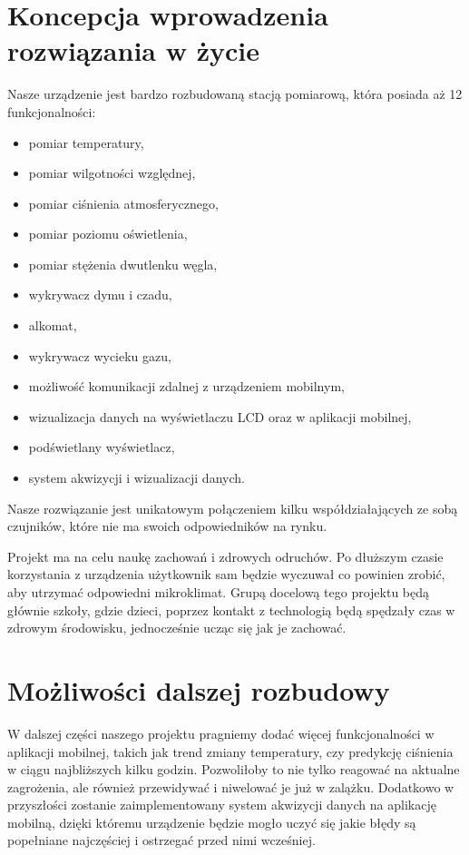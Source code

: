\documentclass[12pt,a4paper]{article}
\begin{document}
\section{Koncepcja wprowadzenia rozwiązania w życie}
Nasze urządzenie jest bardzo rozbudowaną stacją pomiarową, która posiada aż 12 funkcjonalności:
\begin{itemize}
\item pomiar temperatury,
\item pomiar wilgotności względnej,
\item pomiar ciśnienia atmosferycznego,
\item pomiar poziomu oświetlenia,
\item pomiar stężenia dwutlenku węgla,
\item wykrywacz dymu i czadu,
\item alkomat,
\item wykrywacz wycieku gazu,
\item możliwość komunikacji zdalnej z urządzeniem mobilnym,
\item wizualizacja danych na wyświetlaczu LCD oraz w aplikacji mobilnej,
\item podświetlany wyświetlacz,
\item system akwizycji i wizualizacji danych.
\end{itemize}

Nasze rozwiązanie jest unikatowym połączeniem kilku współdziałających ze sobą czujników, które nie ma swoich odpowiedników na rynku. 

Projekt ma na celu naukę zachowań i zdrowych odruchów. Po dłuższym czasie korzystania z urządzenia użytkownik sam będzie wyczuwał co powinien zrobić, aby utrzymać odpowiedni mikroklimat. Grupą docelową tego projektu będą głównie szkoły, gdzie dzieci, poprzez kontakt z technologią będą spędzały czas w zdrowym środowisku, jednocześnie ucząc się jak je zachować.


\section{Możliwości dalszej rozbudowy}
W dalszej części naszego projektu pragniemy dodać więcej funkcjonalności w aplikacji mobilnej, takich jak trend zmiany temperatury, czy predykcję ciśnienia w ciągu najbliższych kilku godzin. Pozwoliłoby to nie tylko reagować na aktualne zagrożenia, ale również przewidywać i niwelować je już w zalążku.
Dodatkowo w przyszłości zostanie zaimplementowany system akwizycji danych na aplikację mobilną, dzięki któremu urządzenie będzie mogło uczyć się jakie błędy są popełniane najczęściej i ostrzegać przed nimi wcześniej.
\end{document}
